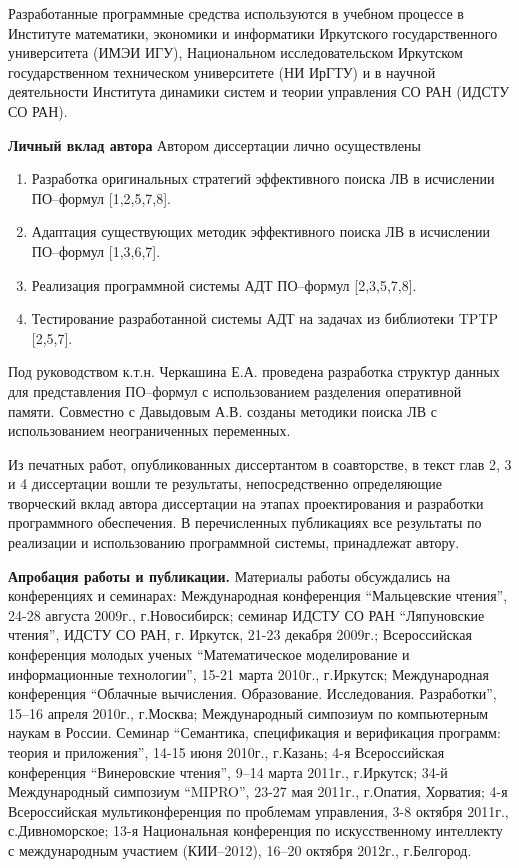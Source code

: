 \documentclass[a4paper]{report}
\begin{document}
Разработанные программные средства используются в учебном процессе в Институте математики, экономики и информатики Иркутского государственного университета (ИМЭИ ИГУ), Национальном исследовательском Иркутском государственном техническом университете (НИ ИрГТУ) и в научной деятельности Института динамики систем и теории управления СО РАН (ИДСТУ СО РАН). %



\textbf{Личный вклад автора}
Автором диссертации лично осуществлены
\begin{enumerate}
\item Разработка оригинальных стратегий эффективного поиска ЛВ в исчислении ПО--формул [1,2,5,7,8].
\item Адаптация существующих методик эффективного поиска ЛВ в исчислении ПО--формул [1,3,6,7].
\item Реализация программной системы АДТ ПО--формул [2,3,5,7,8].
\item Тестирование разработанной системы АДТ на задачах из библиотеки TPTP [2,5,7].
\end{enumerate}



Под руководством к.т.н. Черкашина Е.А. проведена разработка структур данных для представления ПО--формул с использованием разделения оперативной памяти. Совместно с Давыдовым А.В. созданы методики поиска ЛВ с использованием неограниченных переменных.

Из печатных работ, опубликованных диссертантом в соавторстве, в текст глав 2, 3 и 4 диссертации вошли те результаты, непосредственно определяющие творческий вклад автора диссертации на этапах проектирования и разработки программного обеспечения. В перечисленных публикациях все результаты по реализации и использованию программной системы, принадлежат автору.


\textbf{Апробация работы и публикации.}
Материалы работы обсуждались на конференциях и семинарах:
Международная конференция ``Мальцевские чтения'', 24-28 августа 2009г., г.Новосибирск;
семинар ИДСТУ СО РАН ``Ляпуновские чтения'', ИДСТУ СО РАН, г. Иркутск, 21-23 декабря 2009г.;
Всероссийская конференция молодых ученых ``Математическое моделирование и информационные технологии'', 15-21 марта 2010г., г.Иркутск;
Международная конференция ``Облачные вычисления. Образование. Исследования. Разработки'', 15--16 апреля 2010г., г.Москва;
Международный симпозиум по компьютерным наукам в России. Семинар ``Семантика, спецификация и верификация программ: теория и приложения'', 14-15 июня 2010г., г.Казань;
4-я Всероссийская конференция ``Винеровские чтения'', 9--14 марта 2011г., г.Иркутск;
34-й Международный симпозиум ``MIPRO'', 23-27 мая 2011г., г.Опатия, Хорватия;
4-я Всероссийская мультиконференция по проблемам управления,  3-8 октября 2011г., с.Дивноморское;
13-я Национальная конференция по искусственному интеллекту с международным участием (КИИ--2012), 16--20 октября 2012г., г.Белгород.
\end{document}
